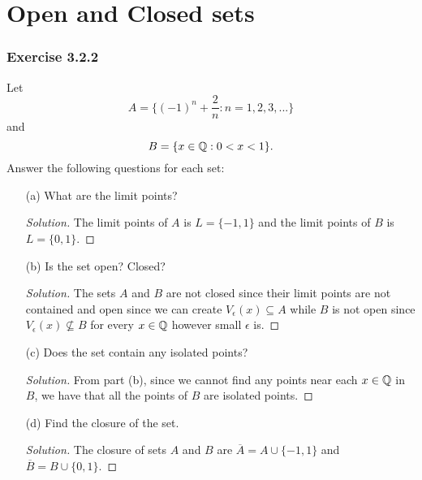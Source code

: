 
\section{Open and Closed sets}


\subsubsection{Exercise 3.2.2} Let 
\[ A = \Big\{ (-1)^n + \frac{ 2 }{ n } : n = 1,2,3,... \Big\}   \]
and
\[ B = \{ x \in \mathbb{Q} : 0 < x < 1 \}.  \]
Answer the following questions for each set:
\begin{enumerate}
    \item[(a)] What are the limit points? 
        \begin{proof}[Solution]
        The limit points of \( A \) is \( L = \{ -1, 1  \}  \) and the limit points of \( B \) is \( L = \{ 0,1 \}  \).
        \end{proof}
    \item[(b)] Is the set open? Closed? 
        \begin{proof}[Solution]
            The sets \( A  \) and \( B \) are not closed since their limit points are not contained and open since we can create \( V_{\epsilon }(x) \subseteq A \) while \( B \) is not open since \( V_{\epsilon }(x) \not \subseteq B \) for every \( x \in \mathbb{Q} \) however small \( \epsilon  \) is.  
        \end{proof}
    \item[(c)] Does the set contain any isolated points? 
        \begin{proof}[Solution]
        From part (b), since we cannot find any points near each \( x \in \mathbb{Q}  \) in \( B \), we have that all the points of \( B  \) are isolated points. 
        \end{proof}
    \item[(d)] Find the closure of the set.
        \begin{proof}[Solution]
            The closure of sets \( A \) and \( B \) are \( \overline{A} = A \cup \{-1,1\}   \) and \( \overline{B} = B \cup \{ 0,1 \}  \). 
        \end{proof}
\end{enumerate}




